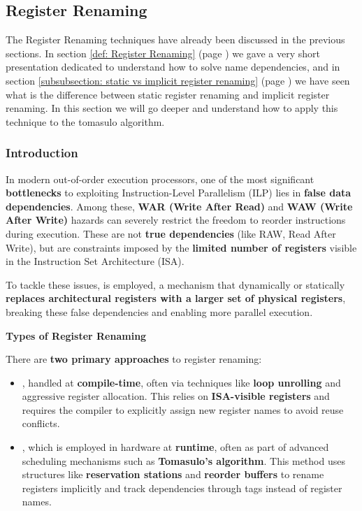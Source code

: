 \subsection{Register Renaming}

The Register Renaming techniques have already been discussed in the previous sections. In section \ref{def: Register Renaming} (page \pageref{def: Register Renaming}) we gave a very short presentation dedicated to understand how to solve name dependencies, and in section \ref{subsubsection: static vs implicit register renaming} (page \pageref{subsubsection: static vs implicit register renaming}) we have seen what is the difference between static register renaming and implicit register renaming. In this section we will go deeper and understand how to apply this technique to the tomasulo algorithm.

\subsubsection{Introduction}

In modern out-of-order execution processors, one of the most significant \textbf{bottlenecks} to exploiting Instruction-Level Parallelism (ILP) lies in \textbf{false data dependencies}. Among these, \textbf{WAR (Write After Read)} and \textbf{WAW (Write After Write)} hazards can severely restrict the freedom to reorder instructions during execution. These are not \textbf{true dependencies} (like RAW, Read After Write), but are constraints imposed by the \textbf{limited number of registers} visible in the Instruction Set Architecture (ISA).

\highspace
To tackle these issues,  is employed, a mechanism that dynamically or statically \textbf{replaces architectural registers with a larger set of physical registers}, breaking these false dependencies and enabling more parallel execution.

\highspace
\begin{flushleft}
    \textcolor{Green3}{ \textbf{Types of Register Renaming}}
\end{flushleft}
There are \textbf{two primary approaches} to register renaming:
\begin{itemize}
    \item {}, handled at \textbf{compile-time}, often via techniques like \textbf{loop unrolling} and aggressive register allocation. This relies on \textbf{ISA-visible registers} and requires the compiler to explicitly assign new register names to avoid reuse conflicts.

    \item {}, which is employed in hardware at \textbf{runtime}, often as part of advanced scheduling mechanisms such as \textbf{Tomasulo's algorithm}. This method uses structures like \textbf{reservation stations} and \textbf{reorder buffers} to rename registers implicitly and track dependencies through tags instead of register names.
\end{itemize}

